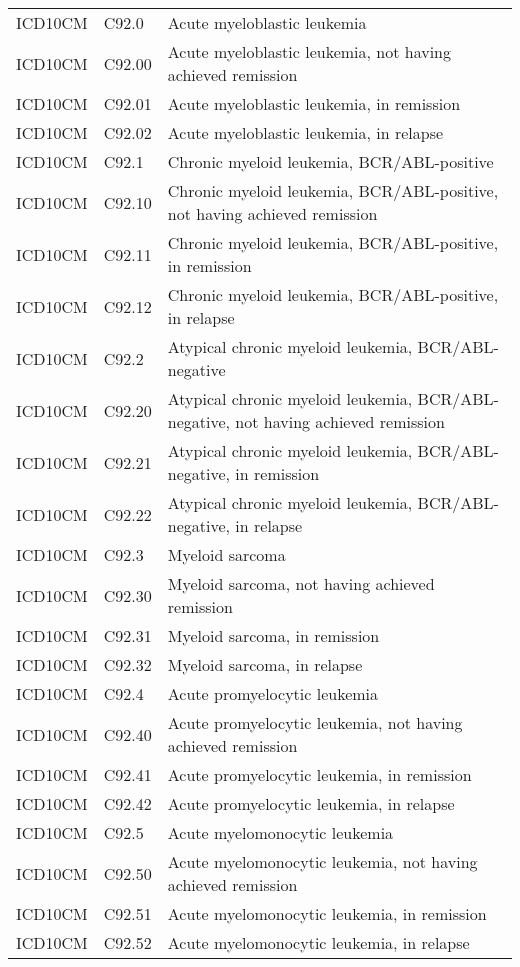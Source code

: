 \begin{table}[ht]
\begin{tabular}{lll}
  ICD10CM & C92.0 & Acute myeloblastic leukemia \\ 
  ICD10CM & C92.00 & Acute myeloblastic leukemia, not having achieved remission \\ 
  ICD10CM & C92.01 & Acute myeloblastic leukemia, in remission \\ 
  ICD10CM & C92.02 & Acute myeloblastic leukemia, in relapse \\ 
  ICD10CM & C92.1 & Chronic myeloid leukemia, BCR/ABL-positive \\ 
  ICD10CM & C92.10 & Chronic myeloid leukemia, BCR/ABL-positive, not having achieved remission \\ 
  ICD10CM & C92.11 & Chronic myeloid leukemia, BCR/ABL-positive, in remission \\ 
  ICD10CM & C92.12 & Chronic myeloid leukemia, BCR/ABL-positive, in relapse \\ 
  ICD10CM & C92.2 & Atypical chronic myeloid leukemia, BCR/ABL-negative \\ 
  ICD10CM & C92.20 & Atypical chronic myeloid leukemia, BCR/ABL-negative, not having achieved remission \\ 
  ICD10CM & C92.21 & Atypical chronic myeloid leukemia, BCR/ABL-negative, in remission \\ 
  ICD10CM & C92.22 & Atypical chronic myeloid leukemia, BCR/ABL-negative, in relapse \\ 
  ICD10CM & C92.3 & Myeloid sarcoma \\ 
  ICD10CM & C92.30 & Myeloid sarcoma, not having achieved remission \\ 
  ICD10CM & C92.31 & Myeloid sarcoma, in remission \\ 
  ICD10CM & C92.32 & Myeloid sarcoma, in relapse \\ 
  ICD10CM & C92.4 & Acute promyelocytic leukemia \\ 
  ICD10CM & C92.40 & Acute promyelocytic leukemia, not having achieved remission \\ 
  ICD10CM & C92.41 & Acute promyelocytic leukemia, in remission \\ 
  ICD10CM & C92.42 & Acute promyelocytic leukemia, in relapse \\ 
  ICD10CM & C92.5 & Acute myelomonocytic leukemia \\ 
  ICD10CM & C92.50 & Acute myelomonocytic leukemia, not having achieved remission \\ 
  ICD10CM & C92.51 & Acute myelomonocytic leukemia, in remission \\ 
  ICD10CM & C92.52 & Acute myelomonocytic leukemia, in relapse \\ 

\end{tabular}
\end{table}
